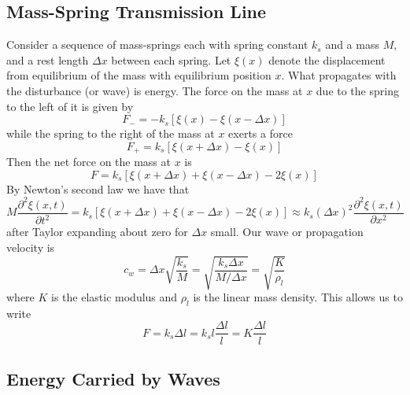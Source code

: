\documentclass[12pt, a4paper, oneside, openright, titlepage]{book}
\begin{document}
\subsection{Mass-Spring Transmission Line}

Consider a sequence of mass-springs each with spring constant $k_s$ and a mass $M$, and a rest length $\Delta x$ between each spring. Let $\xi(x)$ denote the displacement from equilibrium of the mass with equilibrium position $x$. What propagates with the disturbance (or wave) is energy. The force on the mass at $x$ due to the spring to the left of it is given by
\begin{equation*}
    F_- = -k_s\left[\xi(x)-\xi(x-\Delta x)\right]
\end{equation*}
while the spring to the right of the mass at $x$ exerts a force
\begin{equation*}
    F_+ = k_s\left[\xi(x+\Delta x)-\xi(x)\right]
\end{equation*}
Then the net force on the mass at $x$ is
\begin{equation*}
    F = k_s\left[\xi(x+\Delta x)+\xi(x-\Delta x)-2\xi(x)\right]
\end{equation*}
By Newton's second law we have that 
\begin{equation*}
    M\frac{\partial^2\xi(x,t)}{\partial t^2} = k_s\left[\xi(x+\Delta x)+\xi(x-\Delta x)-2\xi(x)\right] \approx k_s(\Delta x)^2\frac{\partial^2\xi(x,t)}{\partial x^2}
\end{equation*}
after Taylor expanding about zero for $\Delta x$ small. Our wave or propagation velocity is 
\begin{equation*}
    c_w = \Delta x\sqrt{\frac{k_s}{M}} = \sqrt{\frac{k_s\Delta x}{M/\Delta x}} = \sqrt{\frac{K}{\rho_l}}
\end{equation*}
where $K$ is the elastic modulus and $\rho_l$ is the linear mass density. This allows us to write
\begin{equation*}
    F = k_s\Delta l = k_sl\frac{\Delta l}{l} = K\frac{\Delta l}{l}
\end{equation*}



\subsection{Energy Carried by Waves}
\end{document}
